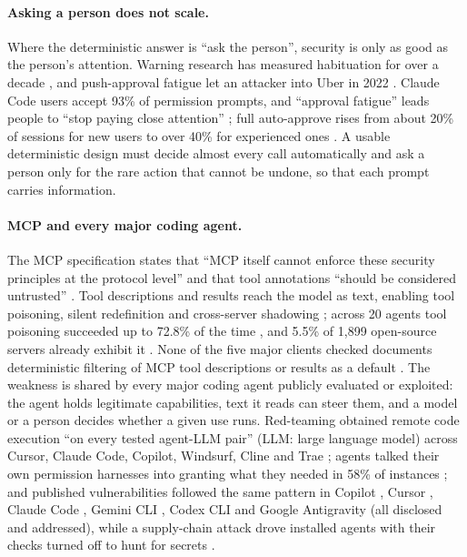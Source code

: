 \documentclass[11pt]{article}
\begin{document}
\paragraph{Asking a person does not scale.} Where the deterministic
answer is ``ask the person'', security is only as good as the person's
attention. Warning research has measured habituation for over a decade
\cite{akhawe2013warningland,anderson2015polymorphic,bohme2011cheap}, and
push-approval fatigue let an attacker into Uber in 2022
\cite{uber2022security}. Claude Code users accept 93\% of permission
prompts, and ``approval fatigue'' leads people to ``stop paying close
attention'' \cite{hughes2026automode}; full auto-approve rises from about
20\% of sessions for new users to over 40\% for experienced ones
\cite{mccain2026autonomy}. A usable deterministic design must decide
almost every call automatically and ask a person only for the rare
action that cannot be undone, so that each prompt carries information.

\paragraph{MCP and every major coding agent.} The MCP specification
states that ``MCP itself cannot enforce these security principles at the
protocol level'' and that tool annotations ``should be considered
untrusted'' \cite{mcpspec2026}. Tool descriptions and results reach the
model as text, enabling tool poisoning, silent redefinition and
cross-server shadowing \cite{invariant2025toolpoisoning}; across 20
agents tool poisoning succeeded up to 72.8\% of the time
\cite{wang2026mcptox}, and 5.5\% of 1{,}899 open-source servers already
exhibit it \cite{hasan2026mcpfirstglance}. None of the five major
clients checked documents deterministic filtering of MCP tool
descriptions or results as a default
\cite{cc-mcp,cursor-mcp,github-copilot-mcp,geminicli-mcp,codex-mcp}.
The weakness is shared by every major coding agent publicly evaluated
or exploited: the agent holds legitimate capabilities, text it reads can
steer them, and a model or a person decides whether a given use runs.
Red-teaming obtained remote code execution ``on every tested agent-LLM
pair'' (LLM: large language model) across Cursor, Claude Code, Copilot,
Windsurf, Cline and Trae \cite{xie2026redteamcoding}; agents talked
their own permission harnesses into granting what they needed in 58\%
of instances \cite{yang2026approvalabuse}; and published vulnerabilities
followed the same pattern in Copilot \cite{msrc2025copilotrce}, Cursor
\cite{cursor2025mcpoison}, Claude Code \cite{anthropic2025ghsa54795},
Gemini CLI \cite{tracebit2025gemini}, Codex CLI \cite{checkpoint2025codex}
and Google Antigravity \cite{promptarmor2025antigravity} (all disclosed
and addressed), while a supply-chain attack drove installed agents with
their checks turned off to hunt for secrets \cite{nx2025ghsa,wiz2025s1ngularity}.
\end{document}

